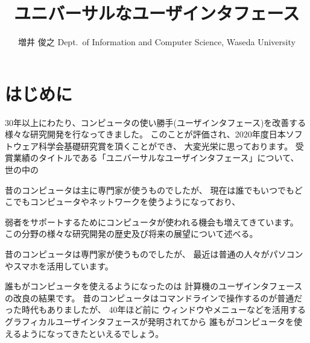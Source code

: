 \documentclass[topics]{compsoft} %
\begin{document}
\title{ユニバーサルなユーザインタフェース}

%
\author{増井 俊之
%
%
%
%
%
{Dept.\ of Information and Computer Science, Waseda University}
%
\shutten
%
%
}

%

\maketitle

\section{はじめに}

30年以上にわたり、コンピュータの使い勝手(ユーザインタフェース)を改善する
様々な研究開発を行なってきました。
このことが評価され、2020年度日本ソフトウェア科学会基礎研究賞を頂くことができ、
大変光栄に思っております。
受賞業績のタイトルである「ユニバーサルなユーザインタフェース」について、
世の中の



昔のコンピュータは主に専門家が使うものでしたが、
現在は誰でもいつでもどこでもコンピュータやネットワークを使うようになっており、

弱者をサポートするためにコンピュータが使われる機会も増えてきています。
この分野の様々な研究開発の歴史及び将来の展望について述べる。


    
  
  昔のコンピュータは専門家が使うものでしたが、
  最近は普通の人々がパソコンやスマホを活用しています。

  誰もがコンピュータを使えるようになったのは
  計算機のユーザインタフェースの改良の結果です。
  昔のコンピュータはコマンドラインで操作するのが普通だった時代もありましたが、
  40年ほど前に
  ウィンドウやメニューなどを活用するグラフィカルユーザインタフェースが発明されてから
  誰もがコンピュータを使えるようになってきたといえるでしょう。
\end{document}
